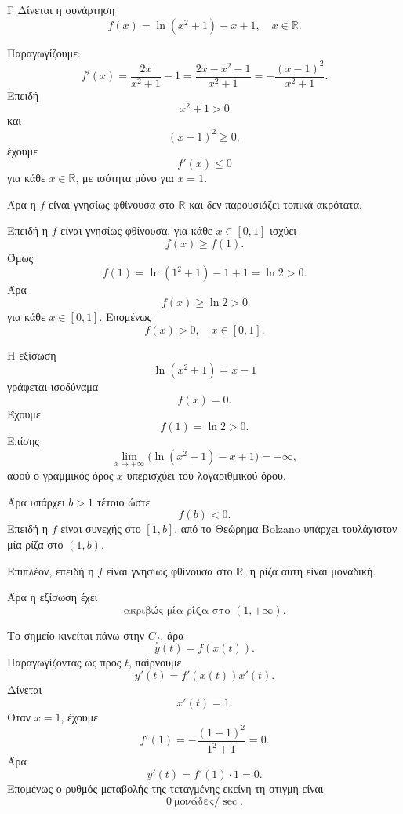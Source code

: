 \begin{thema}{Γ}
Δίνεται η συνάρτηση
\[
f(x)=\ln(x^2+1)-x+1,\quad x\in\mathbb{R}.
\]
\begin{erwthma}
\item Παραγωγίζουμε:
\[
f'(x)=\frac{2x}{x^2+1}-1
=\frac{2x-x^2-1}{x^2+1}
=-\frac{(x-1)^2}{x^2+1}.
\]
Επειδή
\[
x^2+1>0
\]
και
\[
(x-1)^2\geq0,
\]
έχουμε
\[
f'(x)\leq0
\]
για κάθε $x\in\mathbb{R}$, με ισότητα μόνο για $x=1$.

Άρα η $f$ είναι γνησίως φθίνουσα στο $\mathbb{R}$ και δεν παρουσιάζει τοπικά ακρότατα.

\item Επειδή η $f$ είναι γνησίως φθίνουσα, για κάθε $x\in[0,1]$ ισχύει
\[
f(x)\geq f(1).
\]
Όμως
\[
f(1)=\ln(1^2+1)-1+1=\ln2>0.
\]
Άρα
\[
f(x)\geq\ln2>0
\]
για κάθε $x\in[0,1]$. Επομένως
\[
{f(x)>0,\quad x\in[0,1]}.
\]

\item Η εξίσωση
\[
\ln(x^2+1)=x-1
\]
γράφεται ισοδύναμα
\[
f(x)=0.
\]
Έχουμε
\[
f(1)=\ln2>0.
\]
Επίσης
\[
\lim_{x\to+\infty}\bigl(\ln(x^2+1)-x+1\bigr)=-\infty,
\]
αφού ο γραμμικός όρος $x$ υπερισχύει του λογαριθμικού όρου.

Άρα υπάρχει $b>1$ τέτοιο ώστε
\[
f(b)<0.
\]
Επειδή η $f$ είναι συνεχής στο $[1,b]$, από το Θεώρημα Bolzano υπάρχει τουλάχιστον μία ρίζα στο $(1,b)$.

Επιπλέον, επειδή η $f$ είναι γνησίως φθίνουσα στο $\mathbb{R}$, η ρίζα αυτή είναι μοναδική.

Άρα η εξίσωση έχει
\[
{\text{ακριβώς μία ρίζα στο }(1,+\infty)}.
\]

\item Το σημείο κινείται πάνω στην $C_f$, άρα
\[
y(t)=f(x(t)).
\]
Παραγωγίζοντας ως προς $t$, παίρνουμε
\[
y'(t)=f'(x(t))x'(t).
\]
Δίνεται
\[
x'(t)=1.
\]
Όταν $x=1$, έχουμε
\[
f'(1)=-\frac{(1-1)^2}{1^2+1}=0.
\]
Άρα
\[
y'(t)=f'(1)\cdot1=0.
\]
Επομένως ο ρυθμός μεταβολής της τεταγμένης εκείνη τη στιγμή είναι
\[
{0\ \text{μονάδες}/\sec}.
\]
\end{erwthma}
\end{thema}

